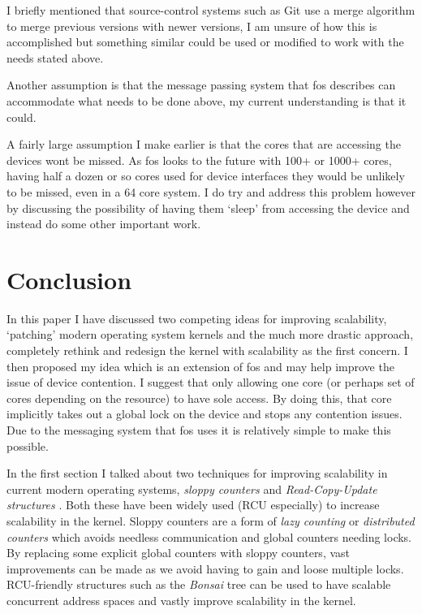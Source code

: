 \documentclass[journal]{IEEEtran}
\begin{document}
I briefly mentioned that source-control systems such as Git use a merge algorithm to merge previous versions with newer versions, I am unsure of how this is accomplished but something similar could be used or modified to work with the needs stated above.

Another assumption is that the message passing system that fos describes can accommodate what needs to be done above, my current understanding is that it could. 

A fairly large assumption I make earlier is that the cores that are accessing the devices wont be missed. As fos looks to the future with 100+ or 1000+ cores, having half a dozen or so cores used for device interfaces they would be unlikely to be missed, even in a 64 core system. I do try and address this problem however by discussing the possibility of having them `sleep' from accessing the device and instead do some other important work.


\section{Conclusion}

In this paper I have discussed two competing ideas for improving scalability, `patching' modern operating system kernels and the much more drastic approach, completely rethink and redesign the kernel with scalability as the first concern. I then proposed my idea which is an extension of fos \cite{fos} and may help improve the issue of device contention. I suggest that only allowing one core (or perhaps set of cores depending on the resource) to have sole access. By doing this, that core implicitly takes out a global lock on the device and stops any contention issues. Due to the messaging system that fos uses it is relatively simple to make this possible.

In the first section I talked about two techniques for improving scalability in current modern operating systems, \emph{sloppy counters} \cite{sloppy-counters} and \emph{Read-Copy-Update structures} \cite{RCU}. Both these have been widely used (RCU especially) to increase scalability in the kernel. Sloppy counters are a form of \emph{lazy counting} or \emph{distributed counters} which avoids needless communication and global counters needing locks. By replacing some explicit global counters with sloppy counters, vast improvements can be made as we avoid having to gain and loose multiple locks. RCU-friendly structures such as the \emph{Bonsai} tree can be used to have scalable concurrent address spaces and vastly improve scalability in the kernel. \cite{Bonsai}
\end{document}
